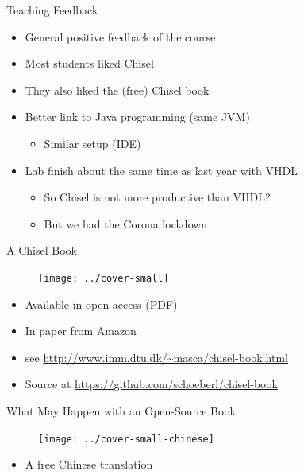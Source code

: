 \begin{frame}[fragile]{Teaching Feedback}
\begin{itemize}
\item General positive feedback of the course
\item Most students liked Chisel
\item They also liked the (free) Chisel book
\item Better link to Java programming (same JVM)
\begin{itemize}
\item Similar setup (IDE)
\end{itemize}
\item Lab finish about the same time as last year with VHDL
\begin{itemize}
\item So Chisel is not more productive than VHDL?
\item But we had the Corona lockdown
\end{itemize}
\end{itemize}
\end{frame}

\begin{frame}[fragile]{A Chisel Book}
\begin{figure}
    \centering
    \texttt{[image: ../cover-small]}
\end{figure}

\begin{itemize}
\item Available in open access (PDF)
\item In paper from Amazon
\item see \url{http://www.imm.dtu.dk/~masca/chisel-book.html}
\item Source at \url{https://github.com/schoeberl/chisel-book}
\end{itemize}
\end{frame}

\begin{frame}[fragile]{What May Happen with an Open-Source Book}
\begin{figure}
    \centering
    \texttt{[image: ../cover-small-chinese]}
\end{figure}

\begin{itemize}
\item A free Chinese translation
\end{itemize}
\end{frame}

